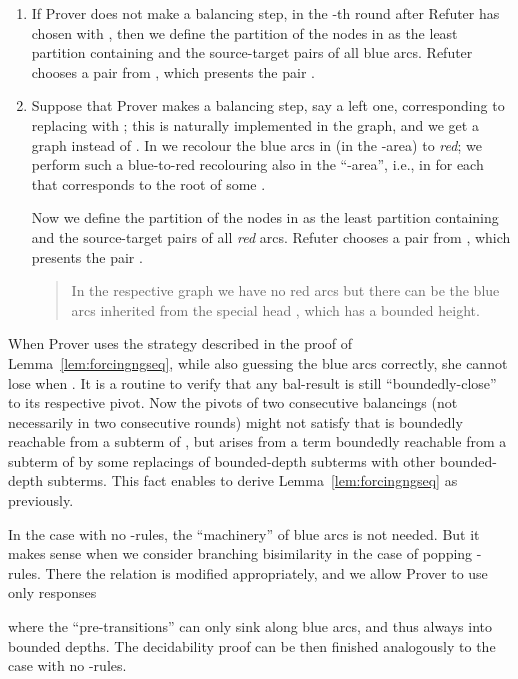 \documentclass{llncs}
\begin{document}
\begin{enumerate}
Now the sets  contain graphs with two designated nodes, and
with coloured arcs.
Refuter thus chooses  by choosing a graph 
with two designated nodes .

\item
If Prover does not make a balancing step, 
in the -th round after Refuter has chosen 
with  , then 
we define the partition
 of the nodes in  as the least partition containing 
 and the source-target pairs of all blue
arcs.
Refuter chooses a pair 
from 
, which presents the pair .

\item 
Suppose that Prover makes a balancing step, say a left one, 
corresponding to replacing  with 
; this is naturally implemented 
in the graph, and we get a graph  instead of . 
In   we recolour the blue arcs in 
(in the -area) to \emph{red}; we perform such a 
blue-to-red recolouring
also in the ``-area'', i.e., in 
for  each
 that corresponds to the root of some .

Now we define the partition
 of the nodes in  as the least partition containing 
 and the source-target pairs of all
\emph{red} arcs.
Refuter chooses a pair 
from 
, which presents the pair .
\begin{quote}
	{\small
		In the respective graph  we have no red
		arcs but there can be the blue arcs inherited 
		from the special
		head , which has a bounded height. 
	}		
\end{quote}

\end{enumerate}
When Prover uses the strategy described 
in the proof of Lemma~\ref{lem:forcingngseq}, while also guessing the
blue arcs correctly, she cannot lose when
.  
It is a routine to verify that any bal-result 
is still ``boundedly-close'' to its respective pivot.
Now the pivots  of two consecutive balancings
(not necessarily in two consecutive rounds) might not satisfy that
 is boundedly reachable from a subterm of , but  arises
from a term  boundedly reachable from a subterm of  by some
replacings of bounded-depth subterms with other bounded-depth
subterms. This fact enables to derive Lemma~\ref{lem:forcingngseq}
as previously.

In the case with no -rules, the ``machinery'' of blue
arcs is not needed. But it makes sense when we consider branching
bisimilarity in the case of popping -rules. 
There the relation  is modified appropriately, and
we allow Prover to use only responses 

where the ``pre-transitions'' 
can only sink 
along blue arcs, and thus always into bounded depths.
The decidability proof can be then finished  analogously to the 
case with no -rules.
\end{document}
